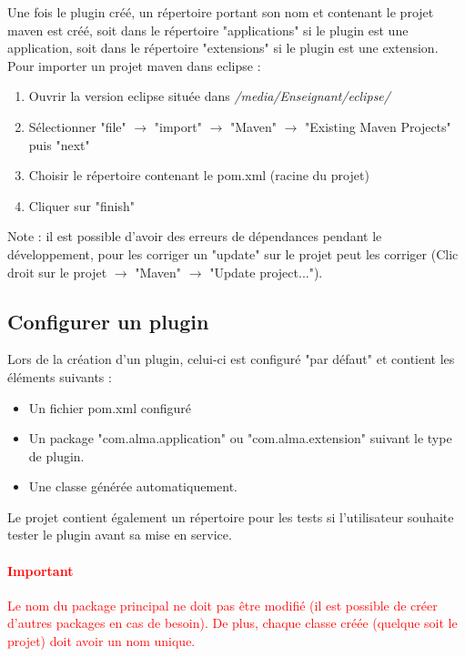    Une fois le plugin créé, un répertoire portant son nom et contenant le projet maven est créé, soit dans le répertoire "applications" si le plugin est une application, soit dans le répertoire "extensions" si le plugin est une extension. Pour importer un projet maven dans eclipse :
    
    \begin{enumerate}
        \item Ouvrir la version eclipse située dans \textit{/media/Enseignant/eclipse/}
        \item Sélectionner "file" $\rightarrow$ "import" $\rightarrow$ "Maven" $\rightarrow$ "Existing Maven Projects" puis "next"
        \item Choisir le répertoire contenant le pom.xml (racine du projet)
        \item Cliquer sur "finish"
    \end{enumerate}
    
    Note : il est possible d'avoir des erreurs de dépendances pendant le développement, pour les corriger un "update" sur le projet peut les corriger (Clic droit sur le projet $\rightarrow$ "Maven" $\rightarrow$ "Update project...").

\subsection{Configurer un plugin}

    Lors de la création d'un plugin, celui-ci est configuré "par défaut" et contient les éléments suivants : 
    
    \begin{itemize}
        \item Un fichier pom.xml configuré
        \item Un package "com.alma.application" ou "com.alma.extension" suivant le type de plugin.
        \item Une classe générée automatiquement.
    \end{itemize}
    
    Le projet contient également un répertoire pour les tests si l'utilisateur souhaite tester le plugin avant sa mise en service.
    
    \paragraph{\textcolor{red}{Important}}
    \textcolor{red}{Le nom du package principal ne doit pas être modifié (il est possible de créer d'autres packages en cas de besoin). De plus, chaque classe créée (quelque soit le projet) doit avoir un nom unique.}
    
